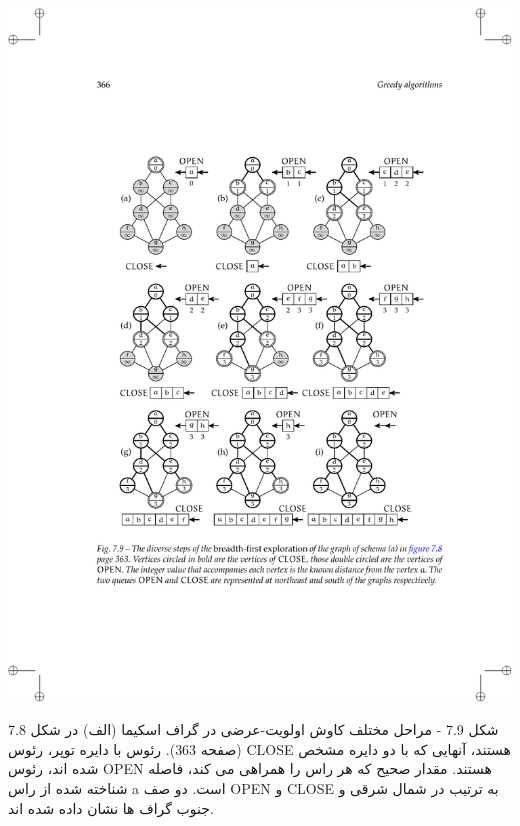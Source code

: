 \documentclass{book} %
\newcommand{\imgcaption}[1]{\color[HTML]{4F4D4D}\footnotesize{#1}}
\begin{document}
\begin{center}
    \includegraphics{./fig7.9.pdf}

\end{center}

شکل 7.9 - مراحل مختلف کاوش اولویت-عرضی در گراف اسکیما (الف) در شکل 7.8 (صفحه 363). رئوس با دایره توپر، رئوس CLOSE هستند، آنهایی که با دو دایره مشخص شده اند، رئوس OPEN هستند. مقدار صحیح که هر راس را همراهی می کند، فاصله شناخته شده از راس a است. دو صف OPEN و CLOSE به ترتیب در شمال شرقی و جنوب گراف ها نشان داده شده اند.
\end{document}
